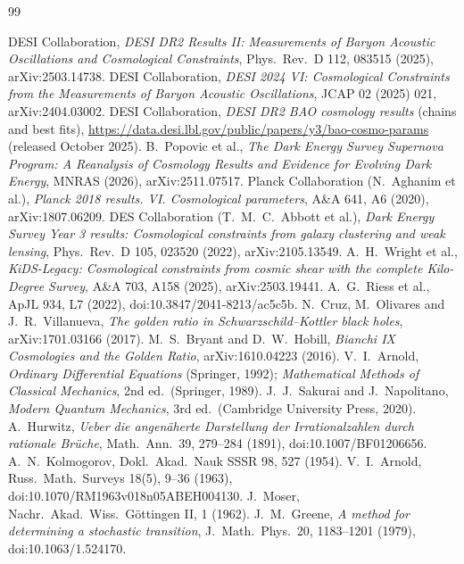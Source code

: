 \documentclass[11pt]{article}
\theoremstyle{definition}
\theoremstyle{remark}
\begin{document}
\begin{thebibliography}{99}\small\raggedright
{} DESI Collaboration, \emph{DESI DR2 Results II: Measurements of Baryon Acoustic Oscillations and Cosmological Constraints}, Phys.\ Rev.\ D 112, 083515 (2025), arXiv:2503.14738.
 DESI Collaboration, \emph{DESI 2024 VI: Cosmological Constraints from the Measurements of Baryon Acoustic Oscillations}, JCAP 02 (2025) 021, arXiv:2404.03002.
 DESI Collaboration, \emph{DESI DR2 BAO cosmology results} (chains and best fits), \url{https://data.desi.lbl.gov/public/papers/y3/bao-cosmo-params} (released October 2025).
 B.~Popovic et al., \emph{The Dark Energy Survey Supernova Program: A Reanalysis of Cosmology Results and Evidence for Evolving Dark Energy}, MNRAS (2026), arXiv:2511.07517.
 Planck Collaboration (N.~Aghanim et al.), \emph{Planck 2018 results. VI. Cosmological parameters}, A\&A 641, A6 (2020), arXiv:1807.06209.
 DES Collaboration (T.~M.~C.~Abbott et al.), \emph{Dark Energy Survey Year 3 results: Cosmological constraints from galaxy clustering and weak lensing}, Phys.\ Rev.\ D 105, 023520 (2022), arXiv:2105.13549.
 A.~H.~Wright et al., \emph{KiDS-Legacy: Cosmological constraints from cosmic shear with the complete Kilo-Degree Survey}, A\&A 703, A158 (2025), arXiv:2503.19441.
 A.~G.~Riess et al., ApJL 934, L7 (2022), doi:10.3847/2041-8213/ac5c5b.
 N.~Cruz, M.~Olivares and J.~R.~Villanueva, \emph{The golden ratio in Schwarzschild--Kottler black holes}, arXiv:1701.03166 (2017).
 M.~S.~Bryant and D.~W.~Hobill, \emph{Bianchi IX Cosmologies and the Golden Ratio}, arXiv:1610.04223 (2016).
 V.~I.~Arnold, \emph{Ordinary Differential Equations} (Springer, 1992); \emph{Mathematical Methods of Classical Mechanics}, 2nd ed.\ (Springer, 1989).
 J.~J.~Sakurai and J.~Napolitano, \emph{Modern Quantum Mechanics}, 3rd ed.\ (Cambridge University Press, 2020).
 A.~Hurwitz, \emph{Ueber die angen\"aherte Darstellung der Irrationalzahlen durch rationale Br\"uche}, Math.\ Ann.\ 39, 279--284 (1891), doi:10.1007/BF01206656.
 A.~N.~Kolmogorov, Dokl.\ Akad.\ Nauk SSSR 98, 527 (1954).
 V.~I.~Arnold, Russ.\ Math.\ Surveys 18(5), 9--36 (1963), doi:10.1070/RM1963v018n05ABEH004130.
 J.~Moser, Nachr.\ Akad.\ Wiss.\ G\"ottingen II, 1 (1962).
 J.~M.~Greene, \emph{A method for determining a stochastic transition}, J.\ Math.\ Phys.\ 20, 1183--1201 (1979), doi:10.1063/1.524170.

\end{thebibliography}
\end{document}
